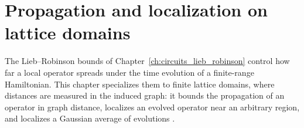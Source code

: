 \chapter{Propagation and localization on lattice domains}
\label{ch:lattice_propagation}

The Lieb--Robinson bounds of Chapter~\ref{ch:circuits_lieb_robinson} control how
far a local operator spreads under the time evolution of a finite-range
Hamiltonian. This chapter specializes them to finite lattice domains, where
distances are measured in the induced graph: it bounds the propagation of an
operator in graph distance, localizes an evolved operator near an arbitrary
region, and localizes a Gaussian average of evolutions
\cite[Sections~2 and~4]{OpenAI2026AreaLaw}.




